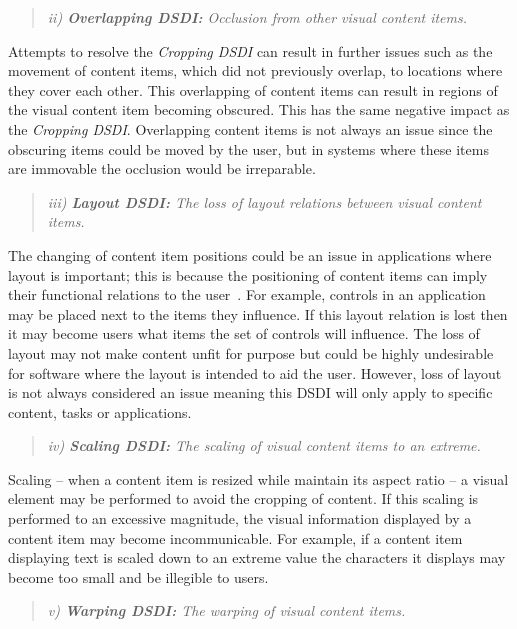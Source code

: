 \documentclass[review,5p,times,twocolumn]{elsarticle}
\begin{document}
\begin{quote}\emph{ii) \textbf{Overlapping \ac{DSDI}:} Occlusion from other visual content items.}\end{quote}

Attempts to resolve the {\emph{Cropping \ac{DSDI}}} can result in further issues such as the movement of content items, which did not previously overlap, to locations where they cover each other.
This overlapping of content items can result in regions of the visual content item becoming obscured.
This has the same negative impact as the {\emph{Cropping \ac{DSDI}}}.
Overlapping content items is not always an issue since the obscuring items could be moved by the user, but in systems where these items are immovable the occlusion would be irreparable.

\begin{quote}\emph{iii) \textbf{Layout \ac{DSDI}:} The loss of layout relations between visual content items.}\end{quote}

The changing of content item positions could be an issue in applications where layout is important; this is because the positioning of content items can imply their functional relations to the user~\cite{Constantine1999}.
For example, controls in an application may be placed next to the items they influence.
If this layout relation is lost then it may become users what items the set of controls will influence. 
The loss of layout may not make content unfit for purpose but could be highly undesirable for software where the layout is intended to aid the user.
However, loss of layout is not always considered an issue meaning this \ac{DSDI} will only apply to specific content, tasks or applications.

\begin{quote}\emph{iv) \textbf{Scaling \ac{DSDI}:} The scaling of visual content items to an extreme.}\end{quote}

Scaling -- when a content item is resized while maintain its aspect ratio -- a visual element may be performed to avoid the cropping of content.
If this scaling is performed to an excessive magnitude, the visual information displayed by a content item may become incommunicable.
For example, if a content item displaying text is scaled down to an extreme value the characters it displays may become too small and be illegible to users.

\begin{quote}\emph{v) \textbf{Warping \ac{DSDI}:} The warping of visual content items.}\end{quote}
\end{document}

